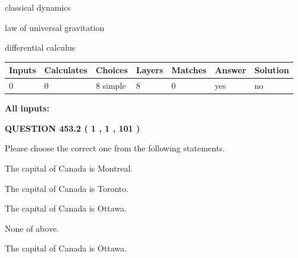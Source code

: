 \documentclass[12pt]{article}
\begin{document}
 
classical dynamics
 
 
law of universal gravitation
 
 
differential calculus
 
 
\noindent{}
 
 
   
   
   
   
\noindent\begin{tabular}{|l|l|l|l|l|l|l|}
 \hline
Inputs & Calculates & Choices & Layers & Matches & Answer & Solution \\ \hline
 0  & 
 0  & 
 8
  simple  
  & 
 8  & 
 0  & 
  yes & 
  no 
  \\ \hline
 \end{tabular}
   
   
   
   
\noindent{}
   
   
   
   
\noindent\vspace{0.1in}\hspace{-0.08in} {\textbf{\Large{All inputs: }}}
   
   
  
\vspace{0.2in}
  
{\textbf{\Large{QUESTION
453.2 
 ( 1 , 1 , 101 )
}}}
  
  
Please choose the correct one from the following statements.
 
 
The capital of Canada is Montreal.
 
 
The capital of Canada is Toronto.
 
 
The capital of Canada is Ottawa.
 
 
 None of above.
 
 
\noindent{}
 
 
The capital of Canada is Ottawa.
 
 
\noindent{}
 
\end{document}
